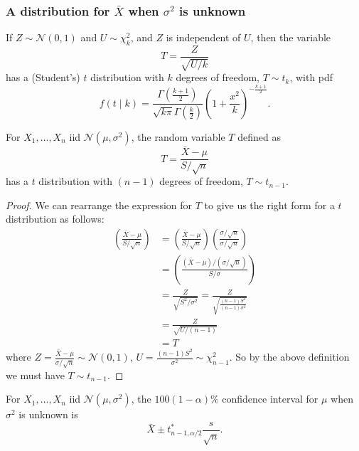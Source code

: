 \documentclass[10pt, a4paper]{article}
\begin{document}
\subsubsection{A distribution for \texorpdfstring{$\bar{X}$}{} when \texorpdfstring{$\sigma ^ 2$}{} is unknown}

\begin{definition}
    If $Z \sim \mathcal{N}(0, 1)$ and $U \sim \chi_{k}^{2}$,
    and $Z$ is independent of $U$,
    then the variable
    \[
    T = \frac{Z}{\sqrt{U / k}}
    \]
    has a
    (Student's)
    $t$ distribution with $k$ degrees of freedom,
    $T \sim t_k$,
    with pdf
    \[
    f(t\mid k) = \frac{\Gamma\left(\frac{k + 1}{2}\right)}{\sqrt{k\pi}\Gamma\left(\frac{k}{2}\right)}\left(1 + \frac{x ^ 2}{k}\right) ^ {-\frac{k + 1}{2}}.
    \]
\end{definition}

\begin{proposition}
    For $X_1, \dotsc, X_n$ iid $\mathcal{N}(\mu, \sigma ^ 2)$,
    the random variable $T$ defined as
    \[
    T = \frac{\bar{X} - \mu}{S / \sqrt{n}}
    \]
    has a $t$ distribution with $(n - 1)$ degrees of freedom,
    $T \sim t_{n - 1}$.

    \begin{proof}
        We can rearrange the expression for $T$ to give us the right form for a $t$ distribution as follows:
        \begin{align*}
            \left(\frac{\bar{X} - \mu}{S / \sqrt{n}}\right) &= \left(\frac{\bar{X} - \mu}{S / \sqrt{n}}\right)\left(\frac{\sigma / \sqrt{n}}{\sigma / \sqrt{n}}\right) \\
            &= \left(\frac{(\bar{X} - \mu) / (\sigma / \sqrt{n})}{S / \sigma}\right) \\
            &= \frac{Z}{\sqrt{S ^ 2 / \sigma ^ 2}} = \frac{Z}{\sqrt{\frac{(n - 1)S ^ 2}{(n - 1)\sigma ^ 2}}} \\
            &= \frac{Z}{\sqrt{U / (n - 1)}} \\
            &= T
        \end{align*}
        where $Z = \frac{\bar{X} - \mu}{\sigma / \sqrt{n}} \sim \mathcal{N}(0, 1)$,
        $U = \frac{(n - 1)S ^ 2}{\sigma ^ 2} \sim \chi_{n - 1}^{2}$.
        So by the above definition we must have $T \sim t_{n - 1}$.
    \end{proof}
\end{proposition}

\begin{proposition}
    For $X_1, \dotsc, X_n$ iid $\mathcal{N}(\mu, \sigma ^ 2)$,
    the $100(1 - \alpha)\%$ confidence interval for $\mu$ when $\sigma ^ 2$ is unknown is
    \[
    \bar{X} \pm t_{n - 1, \alpha / 2}^{*}\frac{s}{\sqrt{n}}.
    \]
\end{proposition}
\end{document}
